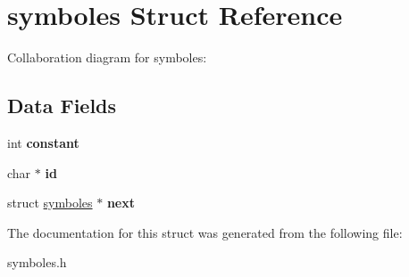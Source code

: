 \hypertarget{structsymboles}{}\section{symboles Struct Reference}
\label{structsymboles}


Collaboration diagram for symboles\+:
\subsection*{Data Fields}
\begin{DoxyCompactItemize}
\item 
\mbox{\label{structsymboles_ac347bb44c6dc857729453831c5714f84}} 
int {\bfseries constant}
\item 
\mbox{\label{structsymboles_aecb3b0d045ada529257a2fbf8f829599}} 
char $\ast$ {\bfseries id}
\item 
\mbox{\label{structsymboles_ab8ce47577f66c3d6ce2d8c043bae5dd1}} 
struct \hyperlink{structsymboles}{symboles} $\ast$ {\bfseries next}
\end{DoxyCompactItemize}


The documentation for this struct was generated from the following file\+:\begin{DoxyCompactItemize}
\item 
symboles.\+h\end{DoxyCompactItemize}
